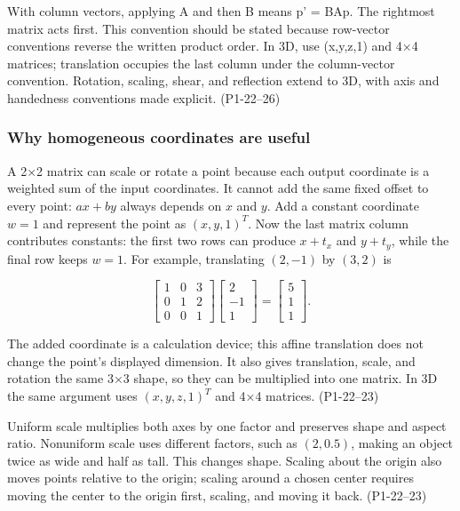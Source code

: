 With column vectors, applying A and then B means p' = BAp. The rightmost matrix acts first. This convention should be stated because row-vector conventions reverse the written product order. In 3D, use (x,y,z,1) and 4×4 matrices; translation occupies the last column under the column-vector convention. Rotation, scaling, shear, and reflection extend to 3D, with axis and handedness conventions made explicit. (P1-22--26)

\subsubsection{Why homogeneous coordinates are useful}\label{03-visual-computing-i-ch001-why-homogeneous-coordinates-are-useful}

A 2×2 matrix can scale or rotate a point because each output coordinate is a weighted sum of the input coordinates. It cannot add the same fixed offset to every point: \(ax+by\) always depends on \(x\) and \(y\). Add a constant coordinate \(w=1\) and represent the point as \((x,y,1)^T\). Now the last matrix column contributes constants: the first two rows can produce \(x+t_x\) and \(y+t_y\), while the final row keeps \(w=1\). For example, translating \((2,-1)\) by \((3,2)\) is

\[
\begin{bmatrix}1&0&3\\0&1&2\\0&0&1\end{bmatrix}
\begin{bmatrix}2\\-1\\1\end{bmatrix}
=
\begin{bmatrix}5\\1\\1\end{bmatrix}.
\]

The added coordinate is a calculation device; this affine translation does not change the point's displayed dimension. It also gives translation, scale, and rotation the same 3×3 shape, so they can be multiplied into one matrix. In 3D the same argument uses \((x,y,z,1)^T\) and 4×4 matrices. (P1-22--23)

Uniform scale multiplies both axes by one factor and preserves shape and aspect ratio. Nonuniform scale uses different factors, such as \((2,0.5)\), making an object twice as wide and half as tall. This changes shape. Scaling about the origin also moves points relative to the origin; scaling around a chosen center requires moving the center to the origin first, scaling, and moving it back. (P1-22--23)

